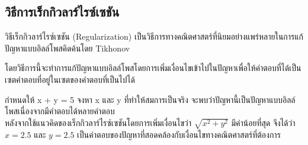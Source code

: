 \subsection{วิธีการเร็กกิวลาร์ไรซ์เซชัน}
\hspace{1cm} วิธีเร็กกิวลาร์ไรซ์เซชัน (Regularization) เป็นวิธีการทางคณิตศาสตร์ที่นิยมอย่างแพร่หลายในการแก้ปัญหาแบบอิลล์โพสคิดค้นโดย Tikhonov \cite{ref:regularization} 

\hspace{1cm} โดยวิธีการนี้จะทำการแก้ปัญหาแบบอิลล์โพสโดยการเพิ่มเงื่อนไขเข้าไปในปัญหาเพื่อให้คำตอบที่ได้เป็นเซตคำตอบที่อยู่ในเซตของคำตอบที่เป็นไปได้ 

\begin{Example}
    กำหนดให้ x + y = 5 จงหา x และ y ที่ทำให้สมการเป็นจริง
    จะพบว่าปัญหานี้เป็นปัญหาแบบอิลล์โพสเนื่องจากมีคำตอบได้หลายคำตอบ \\
    \hspace{1cm} หลังจากใช้แนวคิดของเร็กกิวลาร์ไรซ์เซชันโดยการเพิ่มเงื่อนไขว่า $\sqrt{x^2+y^2}$ มีค่าน้อยที่สุด
    จึงได้ว่า  $x = 2.5$ และ $y = 2.5$ เป็นคำตอบของปัญหาที่สอดคล้องกับเงื่อนไขทางคณิตศาสตร์ที่ต้องการ
\end{Example}